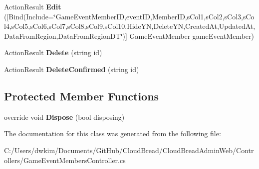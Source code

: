 \begin{DoxyCompactItemize}
\item 
Action\+Result {\bfseries Edit} (\mbox{[}Bind(Include=\char`\"{}Game\+Event\+Member\+ID,event\+ID,Member\+ID,s\+Col1,s\+Col2,s\+Col3,s\+Col4,s\+Col5,s\+Col6,s\+Col7,s\+Col8,s\+Col9,s\+Col10,Hide\+YN,Delete\+YN,Created\+At,Updated\+At,Data\+From\+Region,Data\+From\+Region\+DT\char`\"{})\mbox{]} Game\+Event\+Member game\+Event\+Member)\hypertarget{a00082_abd5ad9ddf90f171847315db51a5ebbca}{}\label{a00082_abd5ad9ddf90f171847315db51a5ebbca}

\item 
Action\+Result {\bfseries Delete} (string id)\hypertarget{a00082_a858b7434967d16d0e27f0d6a160d1b58}{}\label{a00082_a858b7434967d16d0e27f0d6a160d1b58}

\item 
Action\+Result {\bfseries Delete\+Confirmed} (string id)\hypertarget{a00082_a8753d63a42609dd7a843091871af2066}{}\label{a00082_a8753d63a42609dd7a843091871af2066}

\end{DoxyCompactItemize}
\subsection*{Protected Member Functions}
\begin{DoxyCompactItemize}
\item 
override void {\bfseries Dispose} (bool disposing)\hypertarget{a00082_aaccbacff4145e54f1c7a8ec7c5b80629}{}\label{a00082_aaccbacff4145e54f1c7a8ec7c5b80629}

\end{DoxyCompactItemize}


The documentation for this class was generated from the following file\+:\begin{DoxyCompactItemize}
\item 
C\+:/\+Users/dwkim/\+Documents/\+Git\+Hub/\+Cloud\+Bread/\+Cloud\+Bread\+Admin\+Web/\+Controllers/Game\+Event\+Members\+Controller.\+cs\end{DoxyCompactItemize}
